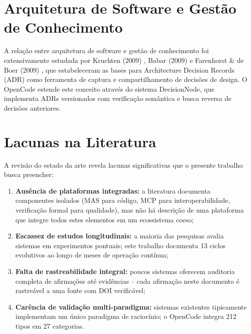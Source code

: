 \documentclass[12pt,a4paper,sumario=tradicional]{abntex2}
\begin{document}
\section{Arquitetura de Software e Gestão de Conhecimento}

A relação entre arquitetura de software e gestão de conhecimento foi extensivamente estudada por Kruchten (2009) \cite{kruchten2009documentation}, Babar (2009) \cite{babar2009supporting} e Farenhorst \& de Boer (2009) \cite{farenhorst2009knowledge}, que estabeleceram as bases para Architecture Decision Records (ADR) como ferramenta de captura e compartilhamento de decisões de design. O OpenCode estende este conceito através do sistema DecisionNode, que implementa ADRs versionados com verificação semântica e busca reversa de decisões anteriores.

\section{Lacunas na Literatura}

A revisão do estado da arte revela lacunas significativas que o presente trabalho busca preencher:

\begin{enumerate}
    \item \textbf{Ausência de plataformas integradas:} a literatura documenta componentes isolados (MAS para código, MCP para interoperabilidade, verificação formal para qualidade), mas não há descrição de uma plataforma que integre todos estes elementos em um ecossistema coeso;
    \item \textbf{Escassez de estudos longitudinais:} a maioria das pesquisas avalia sistemas em experimentos pontuais; este trabalho documenta 13 ciclos evolutivos ao longo de meses de operação contínua;
    \item \textbf{Falta de rastreabilidade integral:} poucos sistemas oferecem auditoria completa de afirmações até evidências -- cada afirmação neste documento é rastreável a uma fonte com DOI verificável;
    \item \textbf{Carência de validação multi-paradigma:} sistemas existentes tipicamente implementam um único paradigma de raciocínio; o OpenCode integra 212 tipos em 27 categorias.
\end{enumerate}

\end{document}
